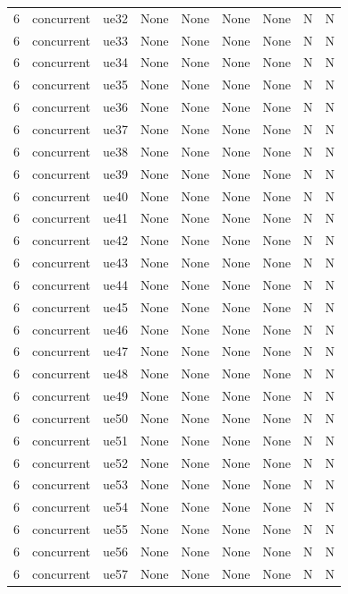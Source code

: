 \begin{table}[ht]
\begin{tabular}{|c|c|c|c|c|c|c|c|c|}
6 & concurrent & ue32 & None & None & None & None & N & N \\
6 & concurrent & ue33 & None & None & None & None & N & N \\
6 & concurrent & ue34 & None & None & None & None & N & N \\
6 & concurrent & ue35 & None & None & None & None & N & N \\
6 & concurrent & ue36 & None & None & None & None & N & N \\
6 & concurrent & ue37 & None & None & None & None & N & N \\
6 & concurrent & ue38 & None & None & None & None & N & N \\
6 & concurrent & ue39 & None & None & None & None & N & N \\
6 & concurrent & ue40 & None & None & None & None & N & N \\
6 & concurrent & ue41 & None & None & None & None & N & N \\
6 & concurrent & ue42 & None & None & None & None & N & N \\
6 & concurrent & ue43 & None & None & None & None & N & N \\
6 & concurrent & ue44 & None & None & None & None & N & N \\
6 & concurrent & ue45 & None & None & None & None & N & N \\
6 & concurrent & ue46 & None & None & None & None & N & N \\
6 & concurrent & ue47 & None & None & None & None & N & N \\
6 & concurrent & ue48 & None & None & None & None & N & N \\
6 & concurrent & ue49 & None & None & None & None & N & N \\
6 & concurrent & ue50 & None & None & None & None & N & N \\
6 & concurrent & ue51 & None & None & None & None & N & N \\
6 & concurrent & ue52 & None & None & None & None & N & N \\
6 & concurrent & ue53 & None & None & None & None & N & N \\
6 & concurrent & ue54 & None & None & None & None & N & N \\
6 & concurrent & ue55 & None & None & None & None & N & N \\
6 & concurrent & ue56 & None & None & None & None & N & N \\
6 & concurrent & ue57 & None & None & None & None & N & N \\

\end{tabular}
\end{table}
